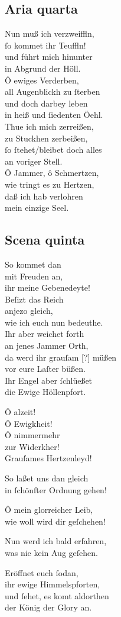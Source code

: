 \documentclass{ees}
\newenvironment{lyrics}[1]{%
  \subsection{#1}\nopagebreak%
  \begin{lyricslist}%
  \let\voice\item%
}{%
  \end{lyricslist}%
}
\begin{document}
\begin{lyrics}{Aria quarta}
  \voice[Judas]
  Nun muß ich verzweiffln,\\
  ſo kommet ihr Teuffln!\\
  und führt mich hinunter\\
  in Abgrund der Höll.\\
  Ô ewiges Verderben,\\
  all Augenblickh zu ſterben\\
  und doch darbey leben\\
  in heiß und ſiedenten Öehl.\\[1ex]
  Thue ich mich zerreißen,\\
  zu Stuckhen zerbeißen,\\
  ſo ſtehet/bleibet doch alles\\
  an voriger Stell.\\
  Ô Jammer, ô Schmertzen,\\
  wie tringt es zu Hertzen,\\
  daß ich hab verlohren\\
  mein einzige Seel.
\end{lyrics}

\begin{lyrics}{Scena quinta}
  \voice[Judex]
  So kommet dan\\
  mit Freuden an,\\
  ihr meine Gebenedeyte!\\
  Beſizt das Reich\\
  anjezo gleich,\\
  wie ich euch nun bedeuthe.\\
  Ihr aber weichet forth\\
  an jenes Jammer Orth,\\
  da werd ihr grauſam [?] müßen\\
  vor eure Laſter büßen.\\
  Ihr Engel aber ſchlüeßet\\
  die Ewige Höllenpfort.

  \voice[Chorus]
  Ô alzeit!\\
  Ô Ewigkheit!\\
  Ô nimmermehr\\
  zur Widerkher!\\
  Grauſames Hertzenleyd!

  \voice[St: Michael]
  So laßet uns dan gleich\\
  in ſchönſter Ordnung gehen!

  \voice[St: Petrus]
  Ô mein glorreicher Leib,\\
  wie woll wird dir geſchehen!

  \voice[St: Magdalena]
  Nun werd ich bald erfahren,\\
  was nie kein Aug geſehen.

  \voice[St: Michael]
  Eröffnet euch ſodan,\\
  ihr ewige Himmelspforten,\\
  und ſehet, es komt aldorthen\\
  der König der Glory an.
\end{lyrics}
\end{document}
